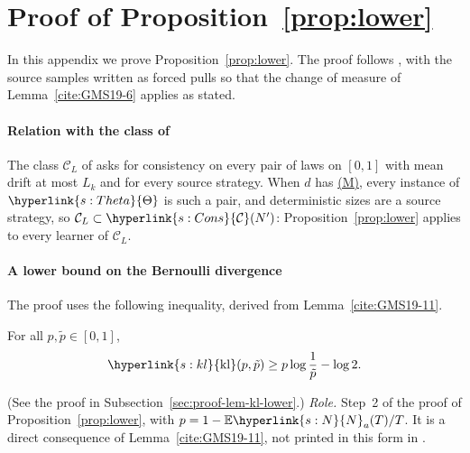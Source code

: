 \documentclass[11pt]{article}
\newcommand{\E}{\mathbb{E}}
\newcommand{\sy}[2]{{\hyperlink{#1}{#2}}}
\newcommand{\term}[2]{\hyperlink{#1}{#2}}
\newcommand{\propM}{\term{s:M}{(M)}}
\newcommand{\Nc}{\sy{s:N}{N}}
\newcommand{\Thet}{\sy{s:Theta}{\Theta}}
\newcommand{\Cons}{\sy{s:Cons}{\mathcal{C}}}
\newcommand{\kl}{\sy{s:kl}{\mathrm{kl}}}
\begin{document}
\section{\texorpdfstring{Proof of Proposition~\ref{prop:lower}}{Proof of Proposition 4.2}}\label{sec:proof-lower}

In this appendix we prove Proposition~\ref{prop:lower}. The proof follows
\citet[Appendix~A]{PMM25}, with the source samples written as forced pulls so that the change of
measure of Lemma~\ref{cite:GMS19-6} applies as stated.

\paragraph{Relation with the class of \texorpdfstring{\citet{PMRM26}}{Prevost et al. (2026)}} The
class $\mathcal C_L$ of \citet[Section~4.2]{PMRM26} asks for consistency on every pair of laws on
$[0,1]$ with mean drift at most $L_k$ and for every source strategy. When $d$ has \propM{}, every
instance of $\Thet$ is such a pair, and deterministic sizes are a source strategy, so
$\mathcal C_L\subset\Cons(N')$: Proposition~\ref{prop:lower} applies to every learner of
$\mathcal C_L$.

\paragraph{A lower bound on the Bernoulli divergence} The proof uses the following inequality,
derived from Lemma~\ref{cite:GMS19-11}.

\begin{lemma}[A lower bound on $\kl$]\label{lem:kl-lower}
For all $p,\tilde p\in[0,1]$,
\begin{equation*}
\kl(p,\tilde p)\ge p\log\frac1{\tilde p}-\log2.
\end{equation*}
\end{lemma}

(See the proof in Subsection~\ref{sec:proof-lem-kl-lower}.) \emph{Role.} Step~2 of the proof of
Proposition~\ref{prop:lower}, with $p=1-\E \Nc_a(T)/T$. It is a direct consequence of
Lemma~\ref{cite:GMS19-11}, not printed in this form in \citet{GMS19}.
\end{document}
